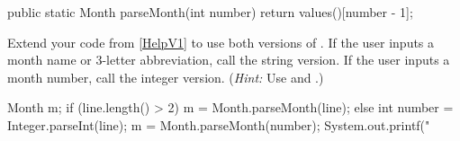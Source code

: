 \begin{answer}[6em]
\begin{javaans}
public static Month parseMonth(int number) {
    return values()[number - 1];
}
\end{javaans}
\end{answer}


\Q \label{key3}
Extend your code from \ref{HelpV1} to use both versions of .
If the user inputs a month name or 3-letter abbreviation, call the string version.
If the user inputs a month number, call the integer version.
(\textit{Hint:} Use  and .)

\begin{answer}[12em]
\begin{javaans}
Month m;
if (line.length() > 2) {
    m = Month.parseMonth(line);
} else {
    int number = Integer.parseInt(line);
    m = Month.parseMonth(number);
}
System.out.printf("%
\end{javaans}
\end{answer}
